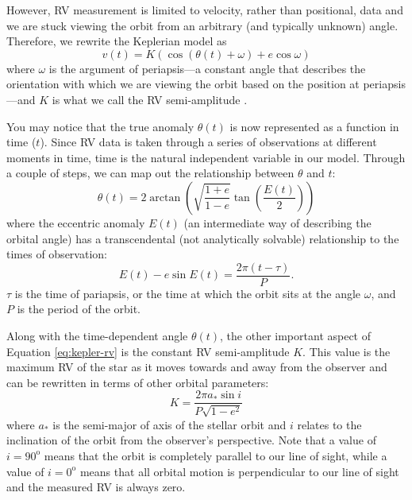 However, RV measurement is limited to velocity, rather than positional, data and we are stuck viewing the orbit from an arbitrary (and typically unknown) angle. Therefore, we rewrite the Keplerian model as
\begin{equation}
    v(t) = K (\cos{(\theta(t)+\omega)} + e \cos{\omega})
    \label{eq:kepler-rv}
\end{equation}
where $\omega$ is the argument of periapsis---a constant angle that describes the orientation with which we are viewing the orbit based on the position at periapsis---and $K$ is what we call the RV semi-amplitude \citep{lovis_radial_2011}.

You may notice that the true anomaly $\theta(t)$ is now represented as a function in time ($t$). Since RV data is taken through a series of observations at different moments in time, time is the natural independent variable in our model. Through a couple of steps, we can map out the relationship between $\theta$ and $t$:
\begin{equation}
    \theta(t) = 2 \arctan{\left(\sqrt{\frac{1+e}{1-e}}\tan{\left(\frac{E(t)}{2}\right)}\right)}
    \label{eq:mean-anomaly}
\end{equation}
where the eccentric anomaly $E(t)$ (an intermediate way of describing the orbital angle) has a transcendental (not analytically solvable) relationship to the times of observation:
\begin{equation}
    E(t) - e \sin{E(t)} = \frac{2\pi (t - \tau)}{P}.
    \label{eq:eccentric-anomaly}
\end{equation}
$\tau$ is the time of pariapsis, or the time at which the orbit sits at the angle $\omega$, and $P$ is the period of the orbit.

Along with the time-dependent angle $\theta(t)$, the other important aspect of Equation \ref{eq:kepler-rv} is the constant RV semi-amplitude $K$. This value is the maximum RV of the star as it moves towards and away from the observer and can be rewritten in terms of other orbital parameters:
\begin{equation}
    K = \frac{2\pi a_* \sin{i}}{P\sqrt{1-e^2}}
    \label{eq:rv-semi-amplitude}
\end{equation}
where $a_*$ is the semi-major of axis of the stellar orbit and $i$ relates to the inclination of the orbit from the observer's perspective. Note that a value of $i=90^\mathrm{o}$ means that the orbit is completely parallel to our line of sight, while a value of $i=0^\mathrm{o}$ means that all orbital motion is perpendicular to our line of sight and the measured RV is always zero.

